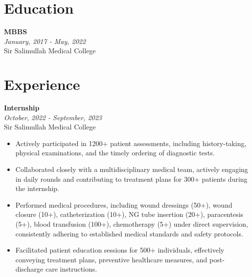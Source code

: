 \documentclass[a4paper,12pt]{article}
\newcommand{\resumeentry}[2]{
    \textbf{#1} \\
    \textit{#2}
}
\begin{document}
\begin{minipage}[t][20cm]{0.64\textwidth}
\section*{Education}
\resumeentry{MBBS}{January, 2017 - May, 2022}\\ Sir Salimullah Medical College \\

\section*{Experience}
\resumeentry{Internship}{October, 2022 - September, 2023}\\ Sir Salimullah Medical College \vspace{0.2cm}
\begin{itemize}[left=0em, topsep=0pt, itemsep=4pt, parsep=0pt]
    \item Actively participated in 1200+ patient assessments, including history-taking, physical examinations, and the timely ordering of diagnostic tests.
    \item Collaborated closely with a multidisciplinary medical team, actively engaging in daily rounds and contributing to treatment plans for 300+ patients during the internship.
    \item Performed medical procedures, including wound dressings (50+), wound closure (10+), catheterization (10+), NG tube insertion (20+), paracentesis (5+), blood transfusion (100+), chemotherapy (5+) under direct supervision, consistently adhering to established medical standards and safety protocols.
    \item Facilitated patient education sessions for 500+ individuals, effectively conveying treatment plans, preventive healthcare measures, and post-discharge care instructions.
\end{itemize}
\end{minipage}
\end{document}
